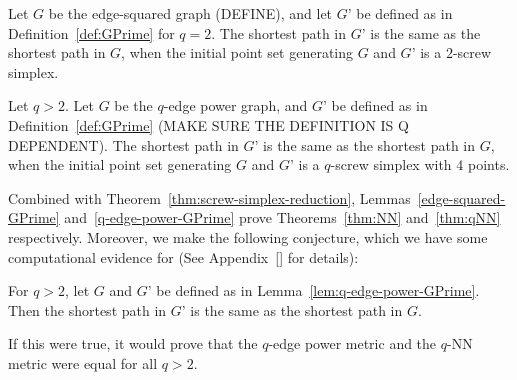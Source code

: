 \begin{lemma}\label{lem:edge-squared-GPrime} Let $G$ be the edge-squared graph
(DEFINE), and let $G’$ be defined as in Definition~\ref{def:GPrime} for $q=2$.
The shortest path in $G’$ is the same as the shortest path in $G$, when the
initial point set generating $G$ and $G’$ is a $2$-screw simplex.

\end{lemma}

\begin{lemma}\label{lem:q-edge-power-GPrime} Let $q > 2$. Let $G$ be the
$q$-edge power graph, and $G’$ be defined as in Definition~\ref{def:GPrime}
(MAKE SURE THE DEFINITION IS Q DEPENDENT). The shortest path in $G’$ is the
same as the shortest path in $G$, when the initial point set generating $G$
and $G’$ is a $q$-screw simplex with $4$ points.

\end{lemma}

Combined with Theorem~\ref{thm:screw-simplex-reduction},
Lemmas~\ref{edge-squared-GPrime} and~\ref{q-edge-power-GPrime} prove
Theorems~\ref{thm:NN} and~\ref{thm:qNN} respectively. Moreover, we make the
following conjecture, which we have some computational evidence for (See
Appendix~\ref{} for details):

\begin{conjecture}\label{conj:qNN}

For $q>2$, let $G$ and $G’$ be defined as in
Lemma~\ref{lem:q-edge-power-GPrime}. Then the shortest path in $G’$ is the same
as the shortest path in $G$.

\end{conjecture}

If this were true, it would prove that the $q$-edge power metric and the
$q$-NN metric were equal for all $q>2$.
